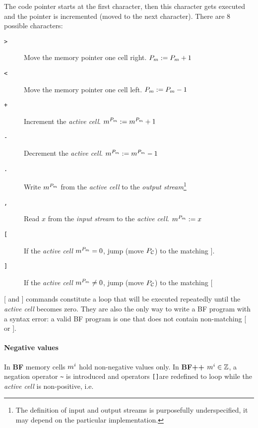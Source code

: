The code pointer starts at the first character, then this character gets executed and the pointer is incremented (moved to the next character).
There are 8 possible characters:

\begin{description}
\item[\texttt{>}] Move the memory pointer one cell right. $P_m := P_m + 1$
\item[\texttt{<}] Move the memory pointer one cell left. $P_m := P_m - 1$
\item[\texttt{+}] Increment the \textit{active cell}. $m^{P_m} := m^{P_m} + 1$
\item[\texttt{-}] Decrement the \textit{active cell}. $m^{P_m} := m^{P_m} - 1$
\item[\texttt{.}] Write $m^{P_m}$ from the \textit{active cell} to the \textit{output stream}\footnote{The definition of input and output streams is purposefully underspecified, it may depend on the particular implementation.}
\item[\texttt{,}] Read $x$ from the \textit{input stream} to the \textit{active cell}. $m^{P_m} := x$
\item[ \texttt{[} ] If the \textit{active cell} $m^{P_m} = 0$, jump (move $P_{\mathcal{C}}$) to the matching $]$.
\item[ \texttt{]} ] If the \textit{active cell} $m^{P_m} \neq 0$, jump (move $P_{\mathcal{C}}$) to the matching $[$
\end{description}

[ and ] commands constitute a loop that will be executed repeatedly until the \textit{active cell} becomes zero.
They are also the only way to write a BF program with a syntax error: a valid BF program is one that does not contain non-matching [ or ].


\paragraph{Negative values}

In \textbf{BF} memory cells $m^i$ hold non-negative values only.
In \textbf{BF++} $m^i \in \mathbb{Z}$, a negation operator \texttt{\~} is introduced and operators \texttt{[]}are redefined to loop while the \textit{active cell} is non-positive, i.e.

